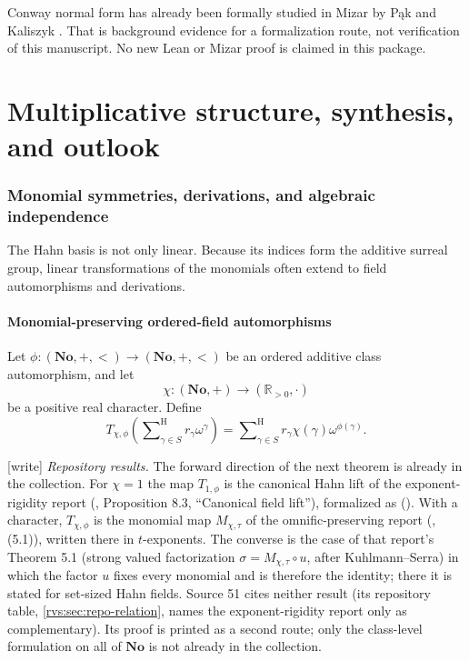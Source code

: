 \documentclass[11pt,letterpaper]{article}
\numberwithin{equation}{section}
\theoremstyle{definition}
\theoremstyle{remark}
\newcommand{\No}{\mathbf{No}}
\newcommand{\R}{\mathbb{R}}
\newcommand{\sH}{\mathop{\sum}\nolimits^{\mathrm H}}
\newcommand{\wtag}{\textup{[write]}}%
\begin{document}
Conway normal form has already been formally studied in Mizar by P\k{a}k and Kaliszyk \cite{PakKaliszyk}. That is background evidence for a formalization route, not verification of this manuscript. No new Lean or Mizar proof is claimed in this package.

\part{Multiplicative structure, synthesis, and outlook}\label{rvs:w:part:outlook}

\section{Monomial symmetries, derivations, and algebraic independence}
\label{rvs:sec:multiplicative}

The Hahn basis is not only linear.  Because its indices form the additive
surreal group, linear transformations of the monomials often extend to field
automorphisms and derivations.

\subsection{Monomial-preserving ordered-field automorphisms}

Let \(\phi:(\No,+,<)\to(\No,+,<)\) be an ordered additive class
automorphism, and let
\[
  \chi:(\No,+)\longrightarrow(\R_{>0},\cdot)
\]
be a positive real character.  Define
\begin{equation}\label{rvs:eq:T-chiphi}
 T_{\chi,\phi}\!\left(
   \sH_{\gamma\in S}r_\gamma\omega^\gamma\right)
 =\sH_{\gamma\in S}
   r_\gamma\chi(\gamma)\omega^{\phi(\gamma)}.
\end{equation}


\noindent\wtag{} \emph{Repository results.}  The forward direction of the
next theorem is already in the collection.  For \(\chi=1\) the map
\(T_{1,\phi}\) is the canonical Hahn lift of the exponent-rigidity report
(, Proposition 8.3,
``Canonical field lift''), formalized as
().  With a
character, \(T_{\chi,\phi}\) is the monomial map \(M_{\chi,\tau}\) of the
omnific-preserving report (,
(5.1)), written there in \(t\)-exponents.  The converse is the case of that
report's Theorem 5.1 (strong valued factorization \(\sigma=M_{\chi,\tau}\circ u\),
after Kuhlmann--Serra) in which the factor \(u\) fixes every monomial and is
therefore the identity; there it is stated for set-sized Hahn fields.  Source
51 cites neither result (its repository table, \cref{rvs:sec:repo-relation},
names the exponent-rigidity report only as complementary).  Its proof is printed as a second route; only the
class-level formulation on all of \(\No\) is not already in the collection.
\end{document}
